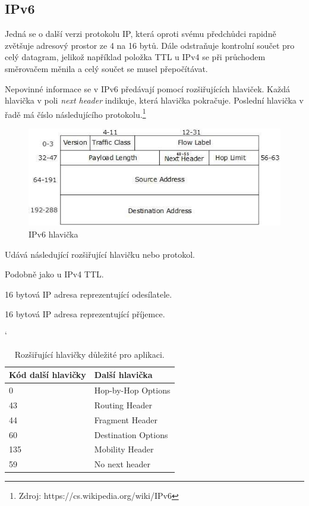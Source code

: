 \documentclass[11pt, a4paper]{article}
\begin{document}
\subsection{IPv6}

Jedná se o další verzi protokolu IP, která oproti svému předchůdci rapidně zvětšuje adresový prostor ze 4 na 16 bytů. 
Dále odstraňuje kontrolní součet pro celý datagram, jelikož například položka TTL u IPv4 se při průchodem směrovačem měnila a celý součet se musel přepočítávat.

Nepovinné informace se v IPv6 předávají pomocí rozšiřujících hlaviček. 
Každá hlavička v poli \emph{next header} indikuje, která hlavička pokračuje. Poslední hlavička v řadě má číslo následujícího protokolu.\footnote{Zdroj: https://cs.wikipedia.org/wiki/IPv6}

\begin{figure}[h!]
\centering{}
  \includegraphics[width=0.6\linewidth]{IPv6_header.jpg}
  \caption[]{IPv6 hlavička\footnotemark}
\end{figure}
\begin{description}[style=multiline,leftmargin=3.5cm]

\item[Další hlavička] 
Udává následující rozšiřující hlavičku nebo protokol.
\item[Hop limit] 
Podobně jako u IPv4 TTL.
\item[Zdrojová IP adresa] 
16 bytová IP adresa reprezentující odesílatele.
\item[Cílová IP adresa] 
16 bytová IP adresa reprezentující příjemce.

\end{description}

\begin{table}[h!] \catcode`
	\centering
	\begin{tabular}{| l | l |}
		\hline
		Kód další hlavičky & Další hlavička\\ \hline
		0 & Hop-by-Hop Options \\ \hline
		43 & Routing Header \\ \hline
		44 & Fragment Header \\ \hline
		60 & Destination Options \\ \hline
		135 & Mobility Header \\ \hline
		59 & No next header \\ \hline
	\end{tabular}
	\caption{Rozšiřující hlavičky důležité pro aplikaci.}
\end{table}
\end{document}
